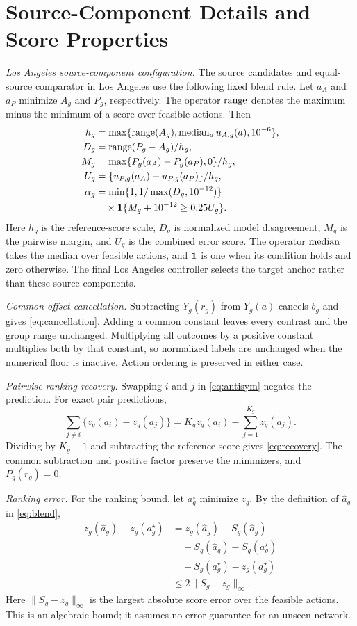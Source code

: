 \appendices
\section{Source-Component Details and Score Properties}
\label{app:score-proofs}


\emph{Los Angeles source-component configuration.}
The source candidates and equal-source comparator in Los Angeles use the
following fixed blend rule. Let $a_A$ and $a_P$ minimize $A_g$ and $P_g$,
respectively. The operator $\operatorname{range}$ denotes the maximum minus the minimum of a score over feasible actions. Then
\begin{align}
 h_g&=\max\{\operatorname{range}(A_g),\operatorname{median}_a u_{A,g}(a),10^{-6}\},\nonumber\\
 D_g&=\operatorname{range}(P_g-A_g)/h_g,\nonumber\\
 M_g&=\max\{P_g(a_A)-P_g(a_P),0\}/h_g,\nonumber\\
 U_g&=\{u_{P,g}(a_A)+u_{P,g}(a_P)\}/h_g,\nonumber\\
 \alpha_g&=\min\{1,1/\max(D_g,10^{-12})\}\nonumber\\
 &\quad{}\times\mathbf{1}\{M_g+10^{-12}\geq0.25U_g\}.
 \label{eq:la-component-blend}
\end{align}
Here $h_g$ is the reference-score scale, $D_g$ is normalized model
disagreement, $M_g$ is the pairwise margin, and $U_g$ is the combined error
score. The operator $\operatorname{median}$ takes the median over feasible actions, and
$\mathbf{1}$ is one when its condition holds and zero otherwise. The final Los
Angeles controller selects the target anchor rather than these source
components.

\emph{Common-offset cancellation.}
Subtracting $Y_g(r_g)$ from $Y_g(a)$ cancels $b_g$ and gives
\eqref{eq:cancellation}. Adding a common constant leaves every contrast and
the group range unchanged. Multiplying all outcomes by a positive constant
multiplies both by that constant, so normalized labels are unchanged when
the numerical floor is inactive. Action ordering is preserved in either case.

\emph{Pairwise ranking recovery.}
Swapping $i$ and $j$ in \eqref{eq:antisym} negates the prediction. For exact
pair predictions,
\begin{equation*}
 \sum_{j\ne i}\{z_g(a_i)-z_g(a_j)\}
 =K_gz_g(a_i)-\sum_{j=1}^{K_g}z_g(a_j).
\end{equation*}
Dividing by $K_g-1$ and subtracting the reference score gives
\eqref{eq:recovery}. The common subtraction and positive factor preserve
the minimizers, and $P_g(r_g)=0$.

\emph{Ranking error.}
For the ranking bound, let $a_g^\star$ minimize $z_g$. By the definition of
$\widehat a_g$ in \eqref{eq:blend},
\begin{align*}
 z_g(\widehat a_g)-z_g(a_g^\star)
 &=z_g(\widehat a_g)-S_g(\widehat a_g)\\
 &\quad+S_g(\widehat a_g)-S_g(a_g^\star)\\
 &\quad+S_g(a_g^\star)-z_g(a_g^\star)\\
 &\leq2\|S_g-z_g\|_\infty.
\end{align*}
Here $\|S_g-z_g\|_\infty$ is the largest absolute score error over the feasible
actions. This is an algebraic bound; it assumes no error guarantee for an
unseen network.
